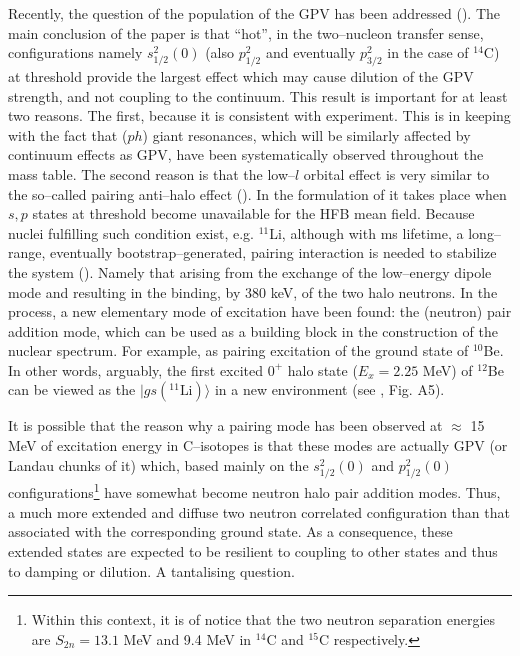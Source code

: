 \documentclass[a4paper,11pt]{article}
\numberwithin{equation}{section}
\numberwithin{figure}{section}
\numberwithin{table}{section}
\newcommand{\ket}[1]{|{#1} \rangle }
\begin{document}
Recently, the question of the population of the GPV has been addressed (\cite{Laskin:16}). The main conclusion of the paper is that ``hot'', in the two--nucleon transfer sense, configurations namely $s^2_{1/2}(0)$ (also $p^2_{1/2}$ and eventually $p^2_{3/2}$ in the case of $^{14}$C) at threshold provide the largest effect which may cause dilution of the GPV strength, and not coupling to the continuum. This result is important for at least two reasons. The first, because it is consistent with experiment. This is in keeping with the fact that ($ph$) giant resonances, which will be similarly affected by continuum effects as GPV, have been systematically observed throughout the mass table. The second reason is that the low--$l$ orbital effect is very similar to the so--called pairing anti--halo effect (\cite{Bennaceur:00}). In the formulation of \cite{Hamamoto:03,Hamamoto:04}    it takes place when $s,p$ states at threshold become unavailable for the HFB mean field. Because nuclei fulfilling such condition exist, e.g. $^{11}$Li, although with ms lifetime, a long--range, eventually bootstrap--generated, pairing interaction is needed to stabilize the system (\cite{Barranco:01,Tanihata:08,Potel:10}). Namely that arising from the exchange of the low--energy dipole mode and resulting in the binding, by 380 keV, of the two halo neutrons. In the process, a new elementary mode of excitation have been found: the (neutron) pair addition mode, which can be used as a building block in the construction of the nuclear spectrum. For example, as pairing excitation of the ground state of $^{10}$Be. In other words, arguably, the first excited $0^+$ halo state ($E_x=2.25$ MeV) of $^{12}$Be can be viewed as the $\ket{gs (^{11}\text{Li})}$ in a new environment (see \cite{Broglia:16}, Fig. A5).

It is possible that the reason why a pairing mode has been observed at $\approx$ 15 MeV of excitation energy in C--isotopes is that these modes are actually GPV (or Landau chunks of it) which, based mainly on the $s^2_{1/2}(0)$ and $p^2_{1/2}(0)$ configurations\footnote{Within this context, it is of notice that the two neutron separation energies are $S_{2n}=13.1$ MeV and 9.4 MeV in $^{14}$C and $^{15}$C respectively.} have somewhat become neutron halo pair addition modes. Thus, a much more extended and diffuse two neutron correlated configuration than that associated with the corresponding ground state. As a consequence, these extended states are expected to be resilient to coupling to other states and thus to damping or dilution. A tantalising question.
\end{document}
